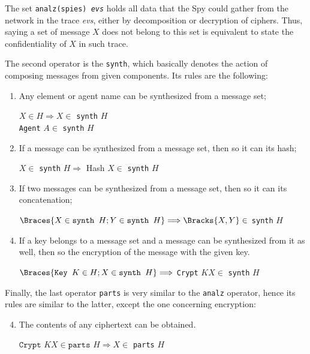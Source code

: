 The set \texttt{analz(spies) \textit{evs}} holds all data that the Spy could gather from the network in the trace \textit{evs}, either by decomposition or decryption of ciphers. Thus, saying a set of message $X$ does not belong to this set is equivalent to state the confidentiality of $X$ in such trace.

The second operator is the \texttt{synth}, which basically denotes the action of composing messages from given components. Its rules are the following:

\begin{enumerate}
  \item Any element or agent name can be synthesized from a message set;
  \begin{center}
    $X \in H \Longrightarrow X \in$ \texttt{synth} $H$ \\
    \texttt{Agent} $A \in$ \texttt{synth} $H$
  \end{center}

  \item If a message can be synthesized from a message set, then so it can its hash;
  \begin{center}
    $X \in$ \texttt{synth} $H \Longrightarrow$ Hash $X \in$ \texttt{synth} $H$
  \end{center}

  \item If two messages can be synthesized from a message set, then so it can its concatenation;
  \begin{center}
    $\Braces{X \in \texttt{synth } H; Y \in \texttt{synth } H} \Longrightarrow \Bracks{X,Y} \in$ \texttt{synth} $H$
  \end{center}

  \item If a key belongs to a message set and a message can be synthesized from it as well, then so the encryption of the message with the given key.
  \begin{center}
    $\Braces{\texttt{Key } K \in H; X \in \texttt{synth } H} \Longrightarrow$ \texttt{Crypt} $K X \in$ \texttt{synth} $H$
  \end{center}
\end{enumerate}

Finally, the last operator \texttt{parts} is very similar to the \texttt{analz} operator, hence its rules are similar to the latter, except the one concerning encryption:

\begin{enumerate} \setcounter{enumi}{3}
  \item The contents of any ciphertext can be obtained.
  \begin{center}
    $\texttt{Crypt } K X \in \texttt{parts } H \Longrightarrow X \in$ \texttt{parts} $H$
  \end{center}
\end{enumerate}

